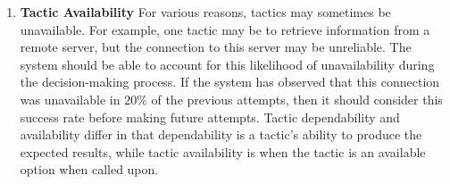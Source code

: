 \documentclass[11pt]{proposalnsf}
\newlength\q %
\begin{document}
\begin{sloppypar}
\begin{enumerate}[noitemsep]
\item \textbf{Tactic Availability} For various reasons, tactics may sometimes be unavailable. For example, one tactic may be to retrieve information from a remote server, but the connection to this server may be unreliable. The system should be able to account for this likelihood of unavailability during the decision-making process. If the system has observed that this connection was unavailable in 20\% of the previous attempts, then it should consider this success rate before making future attempts. Tactic dependability and availability differ in that dependability is a tactic's ability to produce the expected results, while tactic availability is when the tactic is an available option when called upon. 







\end{enumerate}


\end{sloppypar}
\end{document}
